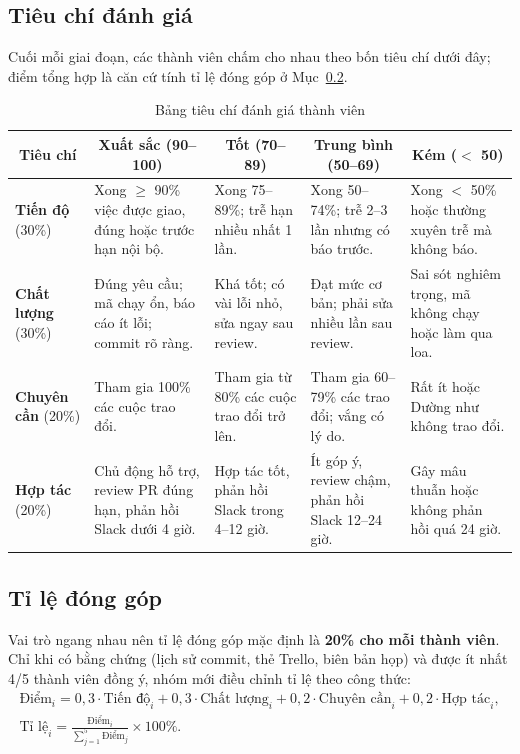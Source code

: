 \documentclass[a4paper]{article}
\begin{document}
\subsection{Tiêu chí đánh giá}
Cuối mỗi giai đoạn, các thành viên chấm cho nhau theo bốn tiêu chí dưới đây; điểm tổng hợp là căn cứ tính tỉ lệ đóng góp ở Mục~\ref{sec:tile}.

\begin{table}[H]
\centering

\begin{tabularx}{\linewidth}{|p{2.3cm}|X|X|X|X|}
\hline
\multicolumn{1}{|c|}{\textbf{Tiêu chí}} & \multicolumn{1}{c|}{\textbf{Xuất sắc (90--100)}} & \multicolumn{1}{c|}{\textbf{Tốt (70--89)}} & \multicolumn{1}{c|}{\textbf{Trung bình (50--69)}} & \multicolumn{1}{c|}{\textbf{Kém ($<$ 50)}} \\ \hline
\textbf{Tiến độ} (30\%) & Xong $\ge$ 90\% việc được giao, đúng hoặc trước hạn nội bộ. & Xong 75--89\%; trễ hạn nhiều nhất 1 lần. & Xong 50--74\%; trễ 2--3 lần nhưng có báo trước. & Xong $<$ 50\% hoặc thường xuyên trễ mà không báo. \\ \hline
\textbf{Chất lượng} (30\%) & Đúng yêu cầu; mã chạy ổn, báo cáo ít lỗi; commit rõ ràng. & Khá tốt; có vài lỗi nhỏ, sửa ngay sau review. & Đạt mức cơ bản; phải sửa nhiều lần sau review. & Sai sót nghiêm trọng, mã không chạy hoặc làm qua loa. \\ \hline
\textbf{Chuyên cần} (20\%) & Tham gia 100\% các cuộc trao đổi. & Tham gia từ 80\% các cuộc trao đổi trở lên. & Tham gia 60--79\% các trao đổi; vắng có lý do. & Rất ít hoặc Dường như không trao đổi. \\ \hline
\textbf{Hợp tác} (20\%) & Chủ động hỗ trợ, review PR đúng hạn, phản hồi Slack dưới 4 giờ. & Hợp tác tốt, phản hồi Slack trong 4--12 giờ. & Ít góp ý, review chậm, phản hồi Slack 12--24 giờ. & Gây mâu thuẫn hoặc không phản hồi quá 24 giờ. \\ \hline
\end{tabularx}
\vspace{8pt}
\caption{Bảng tiêu chí đánh giá thành viên}
\label{tab:tieuchi}
\end{table}

\subsection{Tỉ lệ đóng góp}\label{sec:tile}
Vai trò ngang nhau nên tỉ lệ đóng góp mặc định là \textbf{20\% cho mỗi thành viên}. Chỉ khi có bằng chứng (lịch sử commit, thẻ Trello, biên bản họp) và được ít nhất 4/5 thành viên đồng ý, nhóm mới điều chỉnh tỉ lệ theo công thức:
\begin{gather*}
\text{Điểm}_i = 0{,}3\cdot\text{Tiến độ}_i + 0{,}3\cdot\text{Chất lượng}_i + 0{,}2\cdot\text{Chuyên cần}_i + 0{,}2\cdot\text{Hợp tác}_i, \\[6pt]
\text{Tỉ lệ}_i = \frac{\text{Điểm}_i}{\sum_{j=1}^{5}\text{Điểm}_j}\times 100\%.
\end{gather*}
\end{document}
